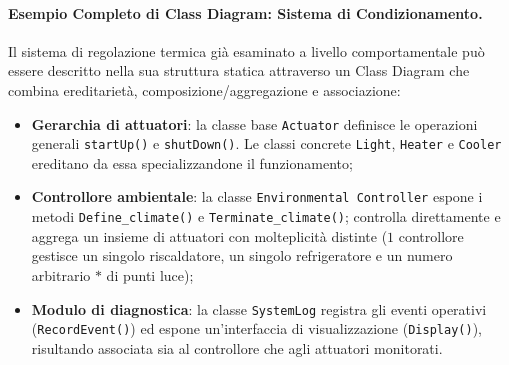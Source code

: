 \documentclass[12pt]{extarticle}
\begin{document}
\paragraph{Esempio Completo di Class Diagram: Sistema di Condizionamento.}
Il sistema di regolazione termica già esaminato a livello comportamentale può essere descritto nella sua struttura statica attraverso un Class Diagram che combina ereditarietà, composizione/aggregazione e associazione:
\begin{itemize}
    \item \textbf{Gerarchia di attuatori}: la classe base \texttt{Actuator} definisce le operazioni generali \texttt{startUp()} e \texttt{shutDown()}. Le classi concrete \texttt{Light}, \texttt{Heater} e \texttt{Cooler} ereditano da essa specializzandone il funzionamento;
    \item \textbf{Controllore ambientale}: la classe \texttt{Environmental Controller} espone i metodi \texttt{Define\_climate()} e \texttt{Terminate\_climate()}; controlla direttamente e aggrega un insieme di attuatori con molteplicità distinte ($1$ controllore gestisce un singolo riscaldatore, un singolo refrigeratore e un numero arbitrario $*$ di punti luce);
    \item \textbf{Modulo di diagnostica}: la classe \texttt{SystemLog} registra gli eventi operativi (\texttt{RecordEvent()}) ed espone un'interfaccia di visualizzazione (\texttt{Display()}), risultando associata sia al controllore che agli attuatori monitorati.
\end{itemize}
\end{document}
